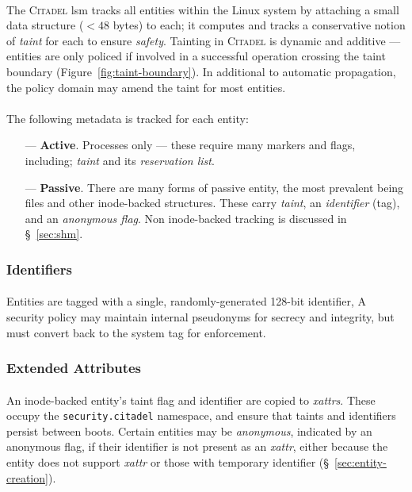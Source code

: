 \paragraph{} The \textsc{Citadel} \acrshort{lsm} tracks all entities within the Linux system by attaching a small data structure ($<48$ bytes) to each; it computes and tracks a conservative notion of \textit{taint} for each to ensure \textit{safety}. Tainting in \textsc{Citadel} is dynamic and additive --- entities are only policed if involved in a successful operation crossing the taint boundary (Figure~\ref{fig:taint-boundary}). In additional to automatic propagation, the policy domain may amend the taint for most entities.

\paragraph{} The following metadata is tracked for each entity:

\begin{enumerate}
    \item[---]\textbf{Active}. Processes only --- these require many markers and flags, including; \textit{taint} and its \textit{reservation list}.
    \item[---] \textbf{Passive}. There are many forms of passive entity, the most prevalent being files and other inode-backed structures. These carry \textit{taint}, an \textit{identifier} (tag), and an \textit{anonymous flag}. Non inode-backed tracking is discussed in §~\ref{sec:shm}.
\end{enumerate}

\subsubsection{Identifiers}
\paragraph{} Entities are tagged with a single, randomly-generated 128-bit identifier, A security policy may maintain internal pseudonyms for secrecy and integrity, but must convert back to the system tag for enforcement.

\subsubsection{Extended Attributes} 
\paragraph{} An inode-backed entity's taint flag and identifier are copied to \textit{\acrshort{xattr}s}. These occupy the \texttt{security.citadel} namespace, and ensure that taints and identifiers persist between boots. Certain entities may be \textit{anonymous}, indicated by an anonymous flag, if their identifier is not present as an \textit{\acrshort{xattr}}, either because the entity does not support \textit{\acrshort{xattr}} or those with temporary identifier (§~\ref{sec:entity-creation}).


